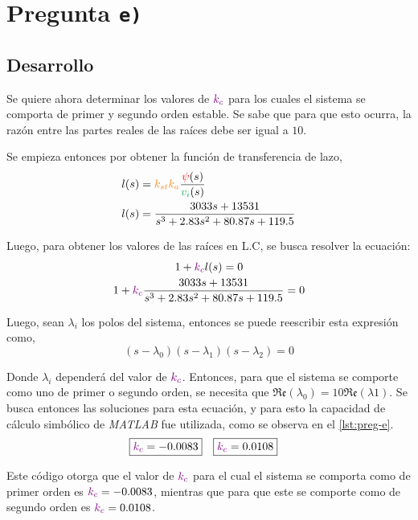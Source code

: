 \section{Pregunta \texttt{e)}}\label{pregunta-e}
\subsection{Desarrollo}

Se quiere ahora determinar los valores de $\mathbin{\color{violet}k_{c}}$ para los cuales el
sistema se comporta de primer y segundo orden estable. Se sabe que para que
esto ocurra, la razón entre las partes reales de las raíces debe ser igual a
$10$.

Se empieza entonces por obtener la función de transferencia de lazo,
\begin{align}
    l(s) &= \nara{k_{st}k_{a}} \frac{\rojo{\psi}(s)}{\verd{v_{i}}(s)} \\
    l(s) &= \frac{3033s + 13531}{s^{3} + 2.83s^{2} + 80.87s + 119.5}
\end{align}

Luego, para obtener los valores de las raíces en L.C, se busca resolver la
ecuación:
\begin{gather}
    1 + \mathbin{\color{violet}k_{c}}l(s) = 0 \\
    1 + \mathbin{\color{violet}k_{c}}\frac{3033s + 13531}{s^{3} + 2.83s^{2} + 80.87s + 119.5} = 0
\end{gather}

Luego, sean $\lambda_{i}$ los polos del sistema, entonces se puede reescribir
esta expresión como,
\begin{equation}
    (s - \lambda_{0})(s - \lambda_{1})(s - \lambda_{2}) = 0
\end{equation}

Donde $\lambda_{i}$ dependerá del valor de $\mathbin{\color{violet}k_{c}}$. Entonces, para que
el sistema se comporte como uno de primer o segundo orden, se necesita que
$\mathfrak{Re}(\lambda_{0}) = 10\mathfrak{Re}(\lambda{1})$. Se busca entonces
las soluciones para esta ecuación, y para esto la capacidad de cálculo simbólico
de \textit{MATLAB} fue utilizada, como se observa en el \autoref{lst:preg-e}.
\begin{align}
    &\boxed{\mathbin{\color{violet}k_{c}} = -0.0083} & &\boxed{\mathbin{\color{violet}k_{c}} = 0.0108}
\end{align}

Este código otorga que el valor de $\mathbin{\color{violet}k_{c}}$ para el cual el sistema se
comporta como de primer orden es $\mathbin{\color{violet}k_{c}} = -0.0083$, mientras que para
que este se comporte como de segundo orden es $\mathbin{\color{violet}k_{c}} = 0.0108$.

